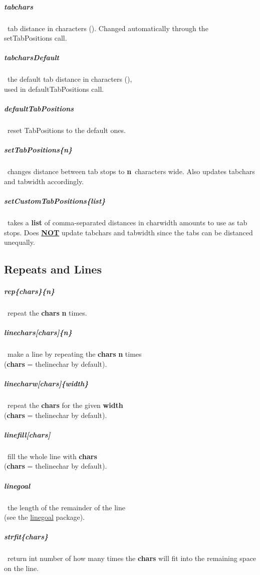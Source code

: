 \documentclass[english,12pt,openany,letterpaper]{book}
\begin{document}
\subparagraph{\bs tabchars} \dash\ tab distance in characters (\tabchars). Changed automatically through the \bs setTabPositions call.

\subparagraph{\bs tabcharsDefault} \dash\ the default tab distance in characters (\tabcharsDefault),\\
used in \bs defaultTabPositions call.

\subparagraph{\bs defaultTabPositions} \dash\ reset \bs TabPositions to the default ones.

\subparagraph{\bs setTabPositions\{n\}} \dash\ changes distance between tab stops to \textbf{n}~characters wide. Also updates \bs tabchars and \bs tabwidth accordingly.

\subparagraph{\bs setCustomTabPositions\{list\}} \dash\ takes a \textbf{list} of comma-separated distances in \bs charwidth amounts to use as tab stops. Does \textbf{\ul{NOT}} update \bs tabchars and \bs tabwidth since the tabs can be distanced unequally.


\break


\subsection{Repeats and Lines}

\subparagraph{\bs rep\{chars\}\{n\}} \dash\ repeat the \textbf{chars} \textbf{n} times.

\subparagraph{\bs linechars[chars]\{n\}} \dash\ make a line by repeating the \textbf{chars} \textbf{n} times
\\\tab(\textbf{chars} = \bs thelinechar by default).

\subparagraph{\bs linecharw[chars]\{width\}} \dash\ repeat the \textbf{chars} for the given \textbf{width}
\\\tab(\textbf{chars} = \bs thelinechar by default).

\subparagraph{\bs linefill[chars]} \dash\ fill the whole line with \textbf{chars}
\\\tab(\textbf{chars} = \bs thelinechar by default).

\subparagraph{\bs linegoal} \dash\ the length of the remainder of the line
\\\tab(see the \href{https://www.ctan.org/pkg/linegoal}{linegoal} package).

\subparagraph{\bs strfit\{chars\}} \dash\ return int number of how many times the \textbf{chars} will fit into the remaining space on the line.

\break
\end{document}
